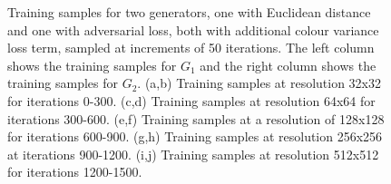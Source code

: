 \begin{figure}[!htbp]
    \hfill
    \hfill
    \hfill
    \hfill
    \hfill
    \caption[Training samples for two generators, one with Euclidean distance and one with adversarial loss, both with additional colour variance loss term]{Training samples for two generators, one with Euclidean distance and one with adversarial loss, both with additional colour variance loss term, sampled at increments of 50 iterations. The left column shows the training samples for $G_{1}$ and the right column shows the training samples for $G_{2}$. (a,b) Training samples at resolution 32x32 for iterations 0-300. (c,d) Training samples at resolution 64x64 for iterations 300-600. (e,f) Training samples at a resolution of 128x128 for iterations 600-900. (g,h) Training samples at resolution 256x256 at iterations 900-1200. (i,j) Training samples at resolution 512x512 for iterations 1200-1500.}
    \label{fig:c3:samples-euclid-adv}
  \end{figure}

